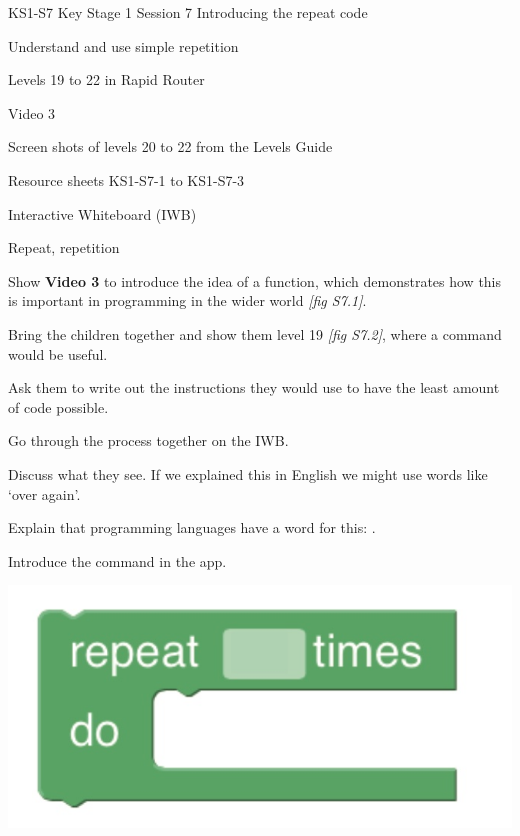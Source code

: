 \documentclass{../../../lessonplan}
\begin{document}
\lessonplantitle
    {KS1-S7}
    {Key Stage 1 Session 7}
    {Introducing the repeat code}

\preamble
    {
    \item Understand and use simple repetition
    }
    {
    \item Levels 19 to 22 in Rapid Router
    \item Video 3
    \item Screen shots of levels 20 to 22 from the Levels Guide
    \item Resource sheets KS1-S7-1 to KS1-S7-3
    \item Interactive Whiteboard (IWB)
    }
    {
    \item Repeat, repetition
    }

\begin{lessonplan}

Show \textbf{Video 3} to introduce the idea of a  function, which demonstrates how this is important in programming in the wider world \textit{[fig S7.1]}.


Bring the children together and show them level 19 \textit{[fig S7.2]}, where a  command would be useful.


Ask them to write out the instructions they would use to have the least amount of code possible.

Go through the process together on the IWB.


Discuss what they see.
If we explained this in English we might use words like `over again'.

Explain that programming languages have a word for this: .

Introduce the  command in the app.

\begin{center}
\includegraphics[width=.667\linewidth]{repeat.jpg}
\end{center}


\end{lessonplan}
\end{document}
